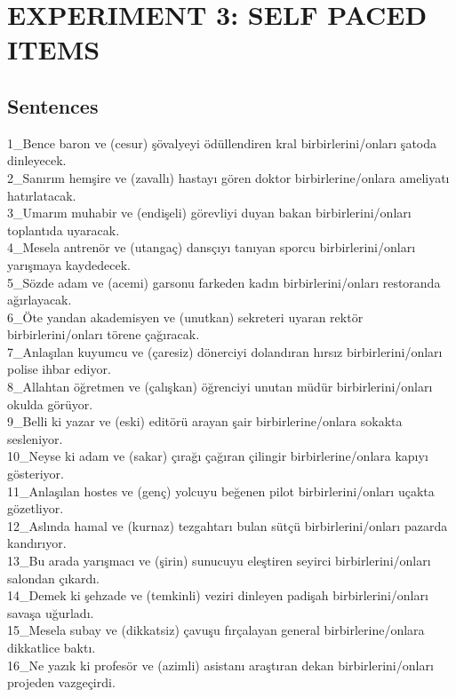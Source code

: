 \chapter{\MakeUppercase{experiment 3: self paced items}} \label{equivalanceitems}
\singlespacing
\section{Sentences}
\begin{myparindent}{0pt}
1\_Bence baron ve (cesur) şövalyeyi ödüllendiren kral birbirlerini/onları şatoda dinleyecek. \\
2\_Sanırım hemşire ve (zavallı) hastayı gören doktor birbirlerine/onlara ameliyatı hatırlatacak. \\
3\_Umarım muhabir ve (endişeli) görevliyi duyan bakan birbirlerini/onları toplantıda uyaracak. \\
4\_Mesela antrenör ve (utangaç) dansçıyı tanıyan sporcu birbirlerini/onları yarışmaya kaydedecek. \\
5\_Sözde adam ve (acemi) garsonu farkeden kadın birbirlerini/onları restoranda ağırlayacak. \\
6\_Öte yandan akademisyen ve (unutkan) sekreteri uyaran rektör birbirlerini/onları törene çağıracak. \\
7\_Anlaşılan kuyumcu ve (çaresiz) dönerciyi dolandıran hırsız birbirlerini/onları polise ihbar ediyor. \\
8\_Allahtan öğretmen ve (çalışkan) öğrenciyi unutan müdür birbirlerini/onları okulda görüyor. \\
9\_Belli ki yazar ve (eski) editörü arayan şair birbirlerine/onlara sokakta sesleniyor. \\
10\_Neyse ki adam ve (sakar) çırağı çağıran çilingir birbirlerine/onlara kapıyı gösteriyor. \\
11\_Anlaşılan hostes ve (genç) yolcuyu beğenen pilot birbirlerini/onları uçakta gözetliyor. \\
12\_Aslında hamal ve (kurnaz) tezgahtarı bulan sütçü birbirlerini/onları pazarda kandırıyor. \\
13\_Bu arada yarışmacı ve (şirin) sunucuyu eleştiren seyirci birbirlerini/onları salondan çıkardı. \\
14\_Demek ki şehzade ve (temkinli) veziri dinleyen padişah birbirlerini/onları savaşa uğurladı. \\
15\_Mesela subay ve (dikkatsiz) çavuşu fırçalayan general birbirlerine/onlara dikkatlice baktı. \\
16\_Ne yazık ki profesör ve (azimli) asistanı araştıran dekan birbirlerini/onları projeden vazgeçirdi. \\

\end{myparindent}
